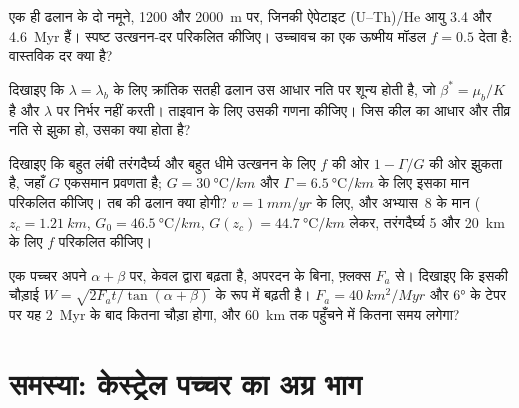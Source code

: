 \begin{exercise}[$\star\star$]\label{exo:b3:orogenic-wedges:9}
एक ही ढलान के दो नमूने, 1200 और \qty{2000}{m} पर, जिनकी ऐपेटाइट
(U--Th)/He आयु 3.4 और \qty{4.6}{Myr} हैं। स्पष्ट
उत्खनन-दर परिकलित कीजिए। उच्चावच का एक ऊष्मीय मॉडल $f = 0.5$ देता है: वास्तविक दर क्या है?
\end{exercise}

\begin{exercise}[$\star\star\star$]\label{exo:b3:orogenic-wedges:10}
दिखाइए कि $\lambda = \lambda_b$ के लिए क्रांतिक सतही ढलान उस आधार नति पर शून्य होती है,
जो $\beta^* = \mu_b/K$ है और $\lambda$ पर निर्भर नहीं करती। ताइवान के लिए
उसकी गणना कीजिए। जिस कील का आधार और तीव्र नति से झुका हो, उसका क्या होता है?
\end{exercise}

\begin{exercise}[$\star\star\star$]\label{exo:b3:orogenic-wedges:11}
दिखाइए कि बहुत लंबी तरंगदैर्घ्य और बहुत धीमे उत्खनन के लिए $f$ की ओर
$1 - \Gamma/G$ की ओर झुकता है, जहाँ $G$ एकसमान प्रवणता है; $G =
\qty{30}{\celsius/km}$ और $\Gamma = \qty{6.5}{\celsius/km}$ के लिए इसका मान परिकलित कीजिए। तब
 की ढलान क्या होगी? $v = \qty{1}{mm/yr}$ के लिए, और
अभ्यास~8 के मान ($z_c = \qty{1.21}{km}$, $G_0 = \qty{46.5}{\celsius/km}$,
$G(z_c) = \qty{44.7}{\celsius/km}$ लेकर, तरंगदैर्घ्य 5 और
\qty{20}{km} के लिए $f$ परिकलित कीजिए।
\end{exercise}

\begin{exercise}[$\star\star\star$]\label{exo:b3:orogenic-wedges:12}
एक पच्चर अपने  $\alpha + \beta$ पर, केवल  द्वारा बढ़ता है,
अपरदन के बिना, फ़्लक्स $F_a$ से। दिखाइए कि इसकी चौड़ाई
$W = \sqrt{2F_at/\tan(\alpha + \beta)}$ के रूप में बढ़ती है। $F_a = \qty{40}{km^2/Myr}$ और
\ang{6} के टेपर पर यह \qty{2}{Myr} के बाद कितना चौड़ा होगा, और
\qty{60}{km} तक पहुँचने में कितना समय लगेगा?
\end{exercise}

\section{समस्या: केस्ट्रेल पच्चर का अग्र भाग}


